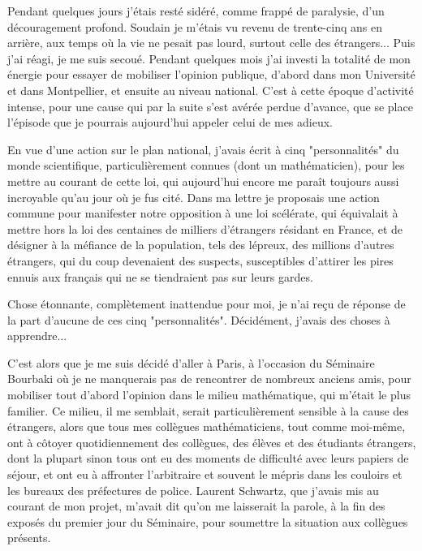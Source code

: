 Pendant quelques jours j'étais resté sidéré, comme frappé de paralysie, d'un découragement profond. Soudain je m'étais vu revenu de trente-cinq ans en arrière, aux temps où la vie ne pesait pas lourd, surtout celle des étrangers... Puis j'ai réagi, je me suis secoué. Pendant quelques mois j'ai investi la totalité de mon énergie pour essayer de mobiliser l'opinion publique, d'abord dans mon Université et dans Montpellier, et ensuite au niveau national. C'est à cette époque d'activité intense, pour une cause qui par la suite s'est avérée perdue d'avance, que se place l'épisode que je pourrais aujourd'hui appeler celui de mes adieux.

En vue d'une action sur le plan national, j'avais écrit à cinq "personnalités" du monde scientifique, particulièrement connues (dont un mathématicien), pour les mettre au courant de cette loi, qui aujourd'hui encore me paraît toujours aussi incroyable qu'au jour où je fus cité. Dans ma lettre je proposais une action commune pour manifester notre opposition à une loi scélérate, qui équivalait à mettre hors la loi des centaines de milliers d'étrangers résidant en France, et de désigner à la méfiance de la population, tels des lépreux, des millions d'autres étrangers, qui du coup devenaient des suspects, susceptibles d'attirer les pires ennuis aux français qui ne se tiendraient pas sur leurs gardes.

Chose étonnante, complètement inattendue pour moi, je n'ai reçu de réponse de la part d'aucune de ces cinq "personnalités". Décidément, j'avais des choses à apprendre...

C'est alors que je me suis décidé d'aller à Paris, à l'occasion du Séminaire Bourbaki où je ne manquerais pas de rencontrer de nombreux anciens amis, pour mobiliser tout d'abord l'opinion dans le milieu mathématique, qui m'était le plus familier. Ce milieu, il me semblait, serait particulièrement sensible à la cause des étrangers, alors que tous mes collègues mathématiciens, tout comme moi-même, ont à côtoyer quotidiennement des collègues, des élèves et des étudiants étrangers, dont la plupart sinon tous ont eu des moments de difficulté avec leurs papiers de séjour, et ont eu à affronter l'arbitraire et souvent le mépris dans les couloirs et les bureaux des préfectures de police. Laurent Schwartz, que j'avais mis au courant de mon projet, m'avait dit qu'on me laisserait la parole, à la fin des exposés du premier jour du Séminaire, pour soumettre la situation aux collègues présents.

